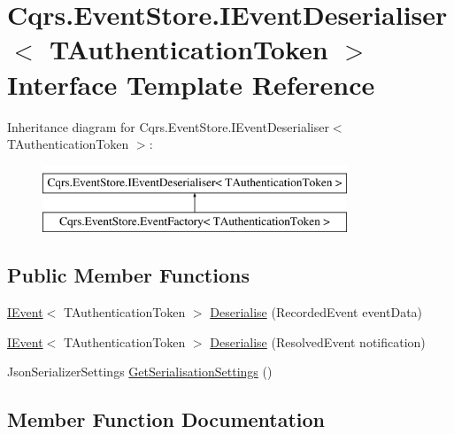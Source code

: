 \hypertarget{interfaceCqrs_1_1EventStore_1_1IEventDeserialiser}{}\section{Cqrs.\+Event\+Store.\+I\+Event\+Deserialiser$<$ T\+Authentication\+Token $>$ Interface Template Reference}
\label{interfaceCqrs_1_1EventStore_1_1IEventDeserialiser}
Inheritance diagram for Cqrs.\+Event\+Store.\+I\+Event\+Deserialiser$<$ T\+Authentication\+Token $>$\+:\begin{figure}[H]
\begin{center}
\leavevmode
\includegraphics[height=2.000000cm]{interfaceCqrs_1_1EventStore_1_1IEventDeserialiser}
\end{center}
\end{figure}
\subsection*{Public Member Functions}
\begin{DoxyCompactItemize}
\item 
\hyperlink{interfaceCqrs_1_1Events_1_1IEvent}{I\+Event}$<$ T\+Authentication\+Token $>$ \hyperlink{interfaceCqrs_1_1EventStore_1_1IEventDeserialiser_ad84a4d975f6e2b5b1fef3fd23e738bfd}{Deserialise} (Recorded\+Event event\+Data)
\item 
\hyperlink{interfaceCqrs_1_1Events_1_1IEvent}{I\+Event}$<$ T\+Authentication\+Token $>$ \hyperlink{interfaceCqrs_1_1EventStore_1_1IEventDeserialiser_a931d4a498b2213aac492bd35518a3286}{Deserialise} (Resolved\+Event notification)
\item 
Json\+Serializer\+Settings \hyperlink{interfaceCqrs_1_1EventStore_1_1IEventDeserialiser_aa2859d10fd556b743679079ac15ffdde}{Get\+Serialisation\+Settings} ()
\end{DoxyCompactItemize}


\subsection{Member Function Documentation}
\mbox{\label{interfaceCqrs_1_1EventStore_1_1IEventDeserialiser_ad84a4d975f6e2b5b1fef3fd23e738bfd}} 
